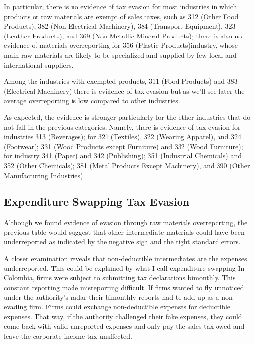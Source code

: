 \documentclass[
  12pt]{article}
\theoremstyle{definition}
\theoremstyle{remark}
\begin{document}
In particular, there is no evidence of tax evasion for most industries
in which products or raw materials are exempt of sales taxes, such as
312 (Other Food Products), 382 (Non-Electrical Machinery), 384
(Transport Equipment), 323 (Leather Products), and 369 (Non-Metallic
Mineral Products); there is also no evidence of materials overreporting
for 356 (Plastic Products)industry, whose main raw materials are likely
to be specialized and supplied by few local and international suppliers.

Among the industries with exempted products, 311 (Food Products) and 383
(Electrical Machinery) there is evidence of tax evasion but as we'll see
later the average overreporting is low compared to other industries.

As expected, the evidence is stronger particularly for the other
industries that do not fall in the previous categories. Namely, there is
evidence of tax evasion for industries 313 (Beverages); for 321
(Textiles), 322 (Wearing Apparel), and 324 (Footwear); 331 (Wood
Products except Furniture) and 332 (Wood Furniture); for industry 341
(Paper) and 342 (Publishing); 351 (Industrial Chemicals) and 352 (Other
Chemicals); 381 (Metal Products Except Machinery), and 390 (Other
Manufacturing Industries).

\subsection{Expenditure Swapping Tax
Evasion}\label{expenditure-swapping-tax-evasion}

Although we found evidence of evasion through raw materials
overreporting, the previous table would suggest that other intermediate
materials could have been underreported as indicated by the negative
sign and the tight standard errors.

A closer examination reveals that non-deductible intermediates are the
expenses underreported. This could be explained by what I call
expenditure swapping In Colombia, firms were subject to submitting tax
declarations bimonthly. This constant reporting made misreporting
difficult. If firms wanted to fly unnoticed under the authority's radar
their bimonthly reports had to add up as a non-evading firm. Firms could
exchange non-deductible expenses for deductible expenses. That way, if
the authority challenged their fake expenses, they could come back with
valid unreported expenses and only pay the sales tax owed and leave the
corporate income tax unaffected.
\end{document}
